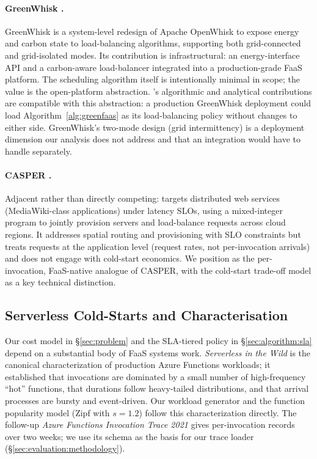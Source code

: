 \paragraph{GreenWhisk \citep{greenwhisk}.} GreenWhisk is a
system-level redesign of Apache OpenWhisk to expose energy and carbon
state to load-balancing algorithms, supporting both grid-connected and
grid-isolated modes. Its contribution is infrastructural: an
energy-interface API and a carbon-aware load-balancer integrated into
a production-grade FaaS platform. The scheduling algorithm itself is
intentionally minimal in scope; the value is the open-platform
abstraction. \GreenFaaS's algorithmic and analytical contributions are
compatible with this abstraction: a production GreenWhisk deployment
could load Algorithm~\ref{alg:greenfaas} as its load-balancing policy
without changes to either side. GreenWhisk's two-mode design (grid
intermittency) is a deployment dimension our analysis does not address
and that an integration would have to handle separately.

\paragraph{CASPER \citep{souza2024casper}.} Adjacent rather than
directly competing: targets distributed web services (MediaWiki-class
applications) under latency SLOs, using a mixed-integer program to
jointly provision servers and load-balance requests across cloud
regions. It addresses spatial routing and provisioning with SLO
constraints but treats requests at the application level (request
rates, not per-invocation arrivals) and does not engage with
cold-start economics. We position \GreenFaaS{} as the per-invocation,
FaaS-native analogue of CASPER, with the cold-start trade-off model as
a key technical distinction.

\subsection{Serverless Cold-Starts and Characterisation}

Our cost model in \S\ref{sec:problem} and the SLA-tiered policy in
\S\ref{sec:algorithm:sla} depend on a substantial body of FaaS
systems work. \emph{Serverless in the Wild}
\citep{shahrad2020serverless} is the canonical characterization of
production Azure Functions workloads; it established that
invocations are dominated by a small number of high-frequency
``hot'' functions, that durations follow heavy-tailed distributions,
and that arrival processes are bursty and event-driven. Our workload
generator and the function popularity model (Zipf with $s = 1.2$)
follow this characterization directly. The follow-up
\emph{Azure Functions Invocation Trace 2021}
\citep{zhang2021faster,azuretrace} gives per-invocation records over
two weeks; we use its schema as the basis for our trace loader
(\S\ref{sec:evaluation:methodology}).

